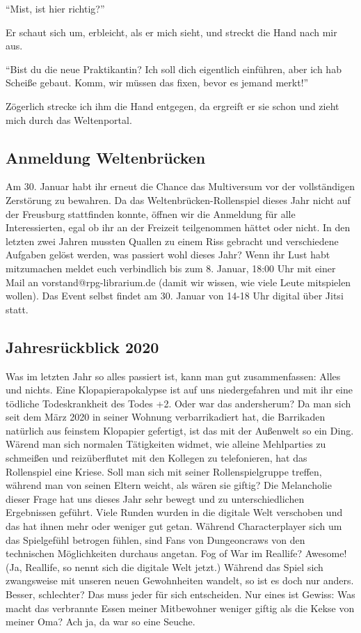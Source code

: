 \documentclass[final]{multiversum}
\begin{document}
\enquote{Mist, ist hier richtig?}

Er schaut sich um, erbleicht, als er mich sieht, und streckt die Hand nach mir aus.

\enquote{Bist du die neue Praktikantin? Ich soll dich eigentlich einführen, aber ich hab Scheiße gebaut. 
Komm, wir müssen das fixen, bevor es jemand merkt!}

Zögerlich strecke ich ihm die Hand entgegen, da ergreift er sie schon und zieht mich durch das Weltenportal.

\subsection{Anmeldung Weltenbrücken}
Am 30. Januar habt ihr erneut die Chance das Multiversum vor der vollständigen Zerstörung zu bewahren. 
Da das Weltenbrücken-Rollenspiel dieses Jahr nicht auf der Freusburg stattfinden konnte, öffnen wir die Anmeldung für alle Interessierten, egal ob ihr an der Freizeit teilgenommen hättet oder nicht. 
In den letzten zwei Jahren mussten Quallen zu einem Riss gebracht und verschiedene Aufgaben gelöst werden, was passiert wohl dieses Jahr?
Wenn ihr Lust habt mitzumachen meldet euch verbindlich bis zum 8. Januar, 18:00 Uhr mit einer Mail an vorstand@rpg-librarium.de (damit wir wissen, wie viele Leute mitspielen wollen).
Das Event selbst findet am 30. Januar von 14-18 Uhr digital über Jitsi statt.

\subsection{Jahresrückblick 2020}
Was im letzten Jahr so alles passiert ist, kann man gut zusammenfassen: Alles und nichts.
Eine Klopapierapokalypse ist auf uns niedergefahren und mit ihr eine tödliche Todeskrankheit des Todes +2.
Oder war das andersherum?
Da man sich seit dem März 2020 in seiner Wohnung verbarrikadiert hat, die Barrikaden natürlich aus feinstem Klopapier gefertigt, ist das mit der Außenwelt so ein Ding.
Wärend man sich normalen Tätigkeiten widmet, wie alleine Mehlparties zu schmeißen und reizüberflutet mit den Kollegen zu telefonieren, hat das Rollenspiel eine Kriese.
Soll man sich mit seiner Rollenspielgruppe treffen, während man von seinen Eltern weicht, als wären sie giftig?
Die Melancholie dieser Frage hat uns dieses Jahr sehr bewegt und zu unterschiedlichen Ergebnissen geführt.
Viele Runden wurden in die digitale Welt verschoben und das hat ihnen mehr oder weniger gut getan.
Während Characterplayer sich um das Spielgefühl betrogen fühlen, sind Fans von Dungeoncraws von den technischen Möglichkeiten durchaus angetan.
Fog of War im Reallife? Awesome! (Ja, Reallife, so nennt sich die digitale Welt jetzt.)
Während das Spiel sich zwangsweise mit unseren neuen Gewohnheiten wandelt, so ist es doch nur anders.
Besser, schlechter? Das muss jeder für sich entscheiden.
Nur eines ist Gewiss:
Was macht das verbrannte Essen meiner Mitbewohner weniger giftig als die Kekse von meiner Oma?
Ach ja, da war so eine Seuche.
\end{document}
